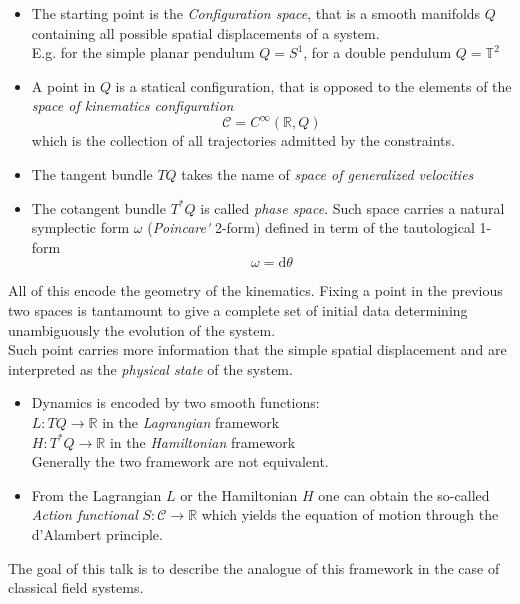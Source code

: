 \begin{center}
\end{center}

\begin{itemize}
	\item The starting point is the \emph{Configuration space}, that is a smooth manifolds $Q$ containing all possible spatial displacements of a system.\\
	E.g. for the simple planar pendulum $Q= S^1$, for a double pendulum $Q =\mathbb{T}^2$
	\item A point in $Q$ is a statical configuration, that is opposed to the elements of the \emph{space of kinematics configuration}
	$$ \mathcal{C} = C^\infty(\mathbb{R},Q)$$
	which is the collection of all trajectories admitted by the constraints.
	\item The tangent bundle $TQ$ takes the name of \emph{space of generalized velocities}
	\item The cotangent bundle $T^\ast Q$ is called \emph{phase space}. Such space carries a natural symplectic form $\omega$ (\emph{Poincare\'} 2-form) defined in term of the tautological 1-form $$\omega= \text{d} \theta$$
\end{itemize}
%
All of this encode the geometry of the kinematics. Fixing a point in the previous two spaces is tantamount to give a complete set of initial data determining unambiguously the evolution of the system. 
\\
Such point carries more information that the simple spatial displacement and are interpreted as the \emph{physical state} of the system.
%
\begin{itemize}
\item Dynamics is encoded by two smooth functions:
	\\ 
	$L:TQ\rightarrow \mathbb{R}$ in the \emph{Lagrangian} framework
	\\
	$H:T^\ast Q \rightarrow \mathbb{R}$ in the \emph{Hamiltonian} framework
	\\
	Generally the two framework are not equivalent.
\item From the Lagrangian $L$ or the Hamiltonian $H$ one can obtain the so-called \emph{Action functional} $S:\mathcal{C}\rightarrow \mathbb{R}$ which yields the equation of motion through the d'Alambert principle.
\end{itemize}
%
The goal of this talk is to describe the analogue of this framework in the case of classical field systems.

